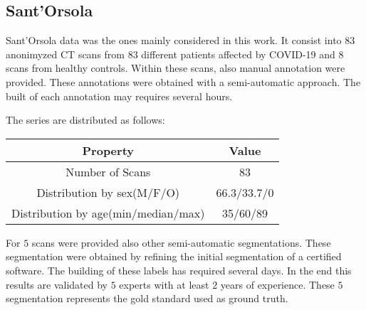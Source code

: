 \documentclass{standalone}
\begin{document}
	\subsection{Sant'Orsola}
	
	Sant'Orsola data was the ones mainly considered in this work. It consist into 83 anonimyzed CT scans from $83$ different patients affected by COVID-19 and $8$ scans from healthy controls. 
	Within these scans, also manual annotation were provided. These annotations were obtained with a semi-automatic approach. The built of each annotation may requires several hours.
	
		The series are distributed as follows: 
	\begin{table}[h!]
		\centering
		\begin{tabular}{|c|c|}
			\hline
			\textbf{Property}   		&	\textbf{Value} \\ \hline
			Number of Scans 			& 83			   \\ 
			Distribution by sex(M/F/O)  		& 66.3/33.7/0    \\
			Distribution by age(min/median/max) & 35/60/89	\\ \hline
		\end{tabular}
	\end{table}
	
	
	For $5$ scans were provided also other semi-automatic segmentations. These segmentation were obtained by refining the initial segmentation of a certified software. The building of these labels has required several days. In the end this results are validated by $5$ experts with at least $2$ years of experience. These $5$ segmentation represents the gold standard used as ground truth.
	
\end{document}
